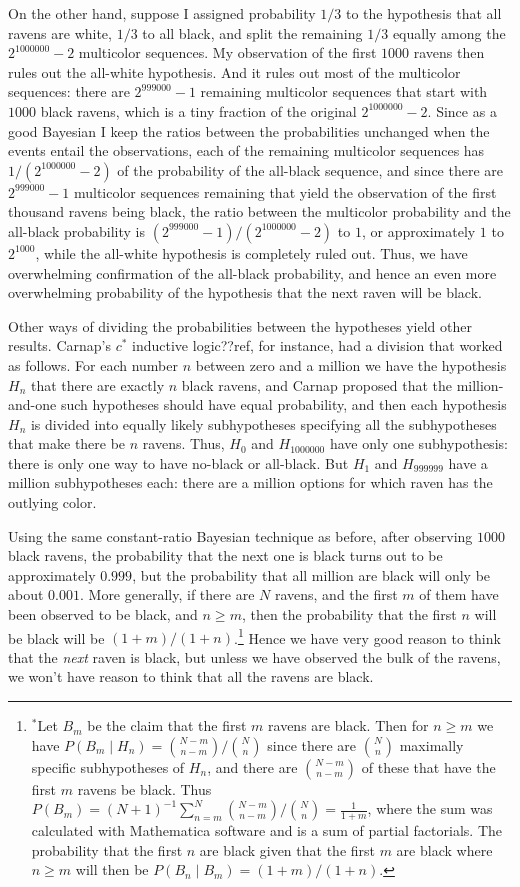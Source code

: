 On the other hand, suppose I assigned probability $1/3$ to the hypothesis that all ravens are white, $1/3$ to all black,
and split the remaining $1/3$ equally among the $2^{1000000}-2$ multicolor sequences. My observation of the first $1000$
ravens then rules out the all-white  hypothesis. And it rules out most of the multicolor sequences: there are $2^{999000}-1$
remaining multicolor sequences that start with $1000$ black ravens, which is a tiny fraction of the original $2^{1000000}-2$. Since as a 
good Bayesian I keep the ratios between the probabilities unchanged when the events entail the observations, each of the remaining multicolor sequences has 
$1/(2^{1000000}-2)$ of the probability of the all-black sequence, and since there are $2^{999000}-1$ multicolor
sequences remaining that yield the observation of the first thousand ravens being black, the ratio between the multicolor probability and the all-black probability
is $(2^{999000}-1)/(2^{1000000}-2)$ to $1$, or approximately $1$ to $2^{1000}$, while the all-white hypothesis
is completely ruled out. Thus, we have overwhelming confirmation of 
the all-black probability, and hence an even more overwhelming probability of the hypothesis that the next raven will be black.

Other ways of dividing the probabilities between the hypotheses yield other results. Carnap's $c^*$ inductive
logic??ref, for instance, had a division
that worked as follows. For each number $n$ between zero and a million we have the hypothesis $H_n$ that there are exactly 
$n$ black ravens, and Carnap proposed that the million-and-one such hypotheses should have equal probability, and then 
each hypothesis $H_n$ is divided into equally likely subhypotheses specifying all the subhypotheses that make there be $n$
ravens. Thus, $H_0$ and $H_{1000000}$ have only one subhypothesis: there is only one way to have no-black or all-black. But
$H_1$ and $H_{999999}$ have a million subhypotheses each: there are a million options for which raven has the outlying
color. 

Using the same constant-ratio Bayesian technique as before, after observing $1000$ black ravens, the probability that the next one is black 
turns out to be approximately $0.999$, but the probability that all million are black will only be about $0.001$. More generally, if there
are $N$ ravens, and the first $m$ of them have been observed to be black, and $n\ge m$, then the probability that the first $n$
will be black will be $(1+m)/(1+n)$.\footnote{$^*$Let $B_m$ be the claim that the first $m$ ravens are black. Then
for $n\ge m$ we have $P(B_m\mid H_n)={N-m \choose n-m}/{N\choose n}$ since there are $N\choose n$ maximally specific subhypotheses of $H_n$, and there are ${N-m\choose n-m}$ of these that have the first $m$ ravens be black. 
Thus $P(B_m)=(N+1)^{-1}\sum_{n=m}^{N} {N-m \choose n-m}/{N\choose n} = \frac{1}{1+m}$, where the sum was
calculated with Mathematica software and is a sum of partial factorials. The probability that the first
$n$ are black given that the first $m$ are black where $n\ge m$ will then be $P(B_n\mid B_m)=(1+m)/(1+n)$.} 
  Hence we have very good reason to think that the \textit{next} raven is black,
but unless we have observed the bulk of the ravens, we won't have reason to think that all the ravens are black. 

